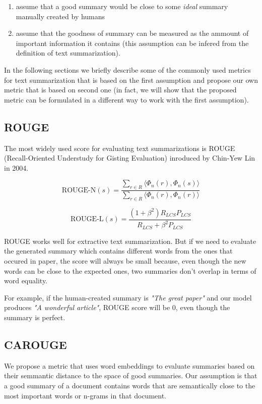 \documentclass[sigplan]{acmart}
\begin{document}
\begin{enumerate}
\item assume that a good summary would be close to some \textit{ideal} summary manually created by humans
\item assume that the goodness of summary can be measured as the ammount of important information it contains (this assumption can be infered from the definition of text summarization).
\end{enumerate}

In the following sections we briefly describe some of the commonly used metrics for text summarization that is based on the first assumption and propose our own metric that is based on second one (in fact, we will show that the proposed metric can be formulated in a different way to work with the first assumption).

\subsection{ROUGE}
\label{sec:rouge}

The most widely used score for evaluating text summarizations is ROUGE (Recall-Oriented Understudy for Gisting Evaluation) inroduced by Chin-Yew Lin in 2004\cite{lin-4}.

\[ \text{ROUGE-N}(s) = \frac{\sum_{r \in R} \langle \Phi_n(r), \Phi_n(s) \rangle}{\sum_{r \in R} \langle \Phi_n(r), \Phi_n(r) \rangle} \]

\[ \text{ROUGE-L}(s) = \frac{(1 + \beta^2) R_{LCS} P_{LCS}}{R_{LCS} + \beta^2 P_{LCS}} \]

ROUGE works well for extractive text summarization. But if we need to evaluate the generated summary which contains different words from the ones that occured in paper, the score will always be small because, even though the new words can be close to the expected ones, two summaries don't overlap in terms of word equality.

For example, if the human-created summary is \textit{"The great paper"} and our model produces \textit{"A wonderful article"}, ROUGE score will be $0$, even though the summary is perfect.

\subsection{CAROUGE}

We propose a metric that uses word embeddings to evaluate summaries based on their semmantic distance to the space of good summaries. Our assumption is that a good summary of a document contains words that are semantically close to the most important words or n-grams in that document.
\end{document}
